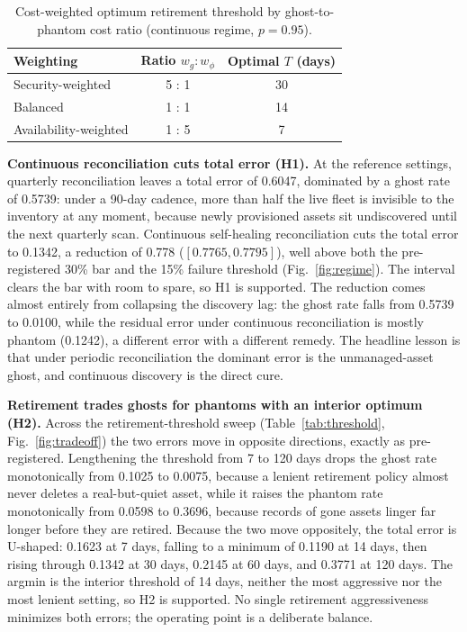 \documentclass[journal]{IEEEtran}
\begin{document}
\begin{table}[t]
\centering
\caption{Cost-weighted optimum retirement threshold by ghost-to-phantom cost ratio (continuous
regime, $p = 0.95$).}
\label{tab:cost}
\footnotesize
\setlength{\tabcolsep}{6pt}
\begin{tabular}{@{}lcc@{}}
\toprule
Weighting & Ratio $w_g : w_\phi$ & Optimal $T$ (days) \\
\midrule
Security-weighted     & 5 : 1 & 30 \\
Balanced              & 1 : 1 & 14 \\
Availability-weighted & 1 : 5 & 7 \\
\bottomrule
\end{tabular}
\end{table}

\textbf{Continuous reconciliation cuts total error (H1).} At the reference settings, quarterly
reconciliation leaves a total error of 0.6047, dominated by a ghost rate of 0.5739: under a 90-day
cadence, more than half the live fleet is invisible to the inventory at any moment, because newly
provisioned assets sit undiscovered until the next quarterly scan. Continuous self-healing
reconciliation cuts the total error to 0.1342, a reduction of 0.778 ($[0.7765, 0.7795]$), well above
both the pre-registered 30\% bar and the 15\% failure threshold (Fig.~\ref{fig:regime}). The interval
clears the bar with room to spare, so H1 is supported. The reduction comes almost entirely from
collapsing the discovery lag: the ghost rate falls from 0.5739 to 0.0100, while the residual error
under continuous reconciliation is mostly phantom (0.1242), a different error with a different
remedy. The headline lesson is that under periodic reconciliation the dominant error is the
unmanaged-asset ghost, and continuous discovery is the direct cure.

\textbf{Retirement trades ghosts for phantoms with an interior optimum (H2).} Across the
retirement-threshold sweep (Table~\ref{tab:threshold}, Fig.~\ref{fig:tradeoff}) the two errors move
in opposite directions, exactly as pre-registered. Lengthening the threshold from 7 to 120 days drops
the ghost rate monotonically from 0.1025 to 0.0075, because a lenient retirement policy almost never
deletes a real-but-quiet asset, while it raises the phantom rate monotonically from 0.0598 to 0.3696,
because records of gone assets linger far longer before they are retired. Because the two move
oppositely, the total error is U-shaped: 0.1623 at 7 days, falling to a minimum of 0.1190 at 14 days,
then rising through 0.1342 at 30 days, 0.2145 at 60 days, and 0.3771 at 120 days. The argmin is the
interior threshold of 14 days, neither the most aggressive nor the most lenient setting, so H2 is
supported. No single retirement aggressiveness minimizes both errors; the operating point is a
deliberate balance.
\end{document}
